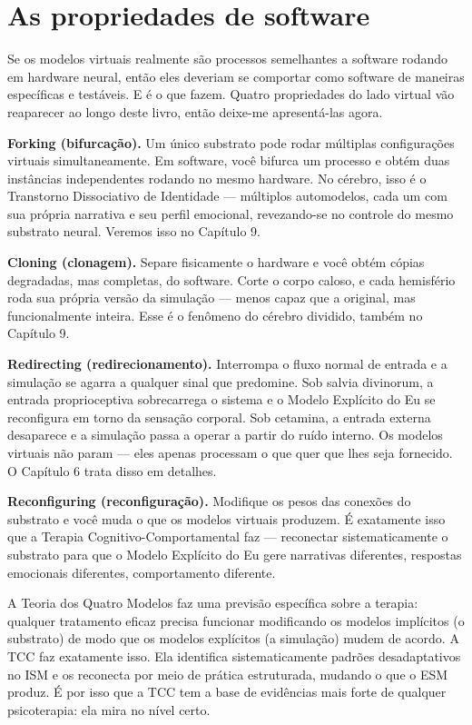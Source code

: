 \documentclass[11pt, twoside, openright]{book}
\begin{document}
\section*{As propriedades de software}

Se os modelos virtuais realmente são processos semelhantes a software rodando em hardware neural, então eles deveriam se comportar como software de maneiras específicas e testáveis. E é o que fazem. Quatro propriedades do lado virtual vão reaparecer ao longo deste livro, então deixe-me apresentá-las agora.

\textbf{Forking (bifurcação).} Um único substrato pode rodar múltiplas configurações virtuais simultaneamente. Em software, você bifurca um processo e obtém duas instâncias independentes rodando no mesmo hardware. No cérebro, isso é o Transtorno Dissociativo de Identidade --- múltiplos automodelos, cada um com sua própria narrativa e seu perfil emocional, revezando-se no controle do mesmo substrato neural. Veremos isso no Capítulo 9.

\textbf{Cloning (clonagem).} Separe fisicamente o hardware e você obtém cópias degradadas, mas completas, do software. Corte o corpo caloso, e cada hemisfério roda sua própria versão da simulação --- menos capaz que a original, mas funcionalmente inteira. Esse é o fenômeno do cérebro dividido, também no Capítulo 9.

\textbf{Redirecting (redirecionamento).} Interrompa o fluxo normal de entrada e a simulação se agarra a qualquer sinal que predomine. Sob salvia divinorum, a entrada proprioceptiva sobrecarrega o sistema e o Modelo Explícito do Eu se reconfigura em torno da sensação corporal. Sob cetamina, a entrada externa desaparece e a simulação passa a operar a partir do ruído interno. Os modelos virtuais não param --- eles apenas processam o que quer que lhes seja fornecido. O Capítulo 6 trata disso em detalhes.

\textbf{Reconfiguring (reconfiguração).} Modifique os pesos das conexões do substrato e você muda o que os modelos virtuais produzem. É exatamente isso que a Terapia Cognitivo-Comportamental faz --- reconectar sistematicamente o substrato para que o Modelo Explícito do Eu gere narrativas diferentes, respostas emocionais diferentes, comportamento diferente.

A Teoria dos Quatro Modelos faz uma previsão específica sobre a terapia: qualquer tratamento eficaz precisa funcionar modificando os modelos implícitos (o substrato) de modo que os modelos explícitos (a simulação) mudem de acordo. A TCC faz exatamente isso. Ela identifica sistematicamente padrões desadaptativos no ISM e os reconecta por meio de prática estruturada, mudando o que o ESM produz. É por isso que a TCC tem a base de evidências mais forte de qualquer psicoterapia: ela mira no nível certo.
\end{document}
